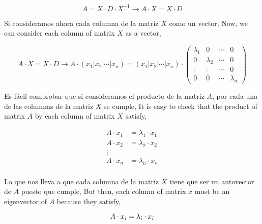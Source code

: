 \begin{equation*}
 A=X \cdot D \cdot X^{-1}\rightarrow A\cdot X= X\cdot D
\end{equation*}
\begin{paracol}{2}
Si consideramos ahora cada columna de la matriz $X$ como un vector,
\switchcolumn
Now, we can consider each column of matrix $X$ as a vector,
\end{paracol}
\begin{equation*}
A\cdot X= X\cdot D \rightarrow A\cdot \left( x_1 | x_2 | \cdots | x_n \right)= \left( x_1 | x_2 | \cdots | x_n \right) \cdot\begin{pmatrix}
\lambda_1& 0 & \cdots & 0\\
0& \lambda_2& \cdots & 0\\
\vdots & \vdots& \cdots & 0\\
0& 0& \cdots & \lambda_n
\end{pmatrix}
\end{equation*}
\begin{paracol}{2}
Es fácil comprobar que si consideramos el producto de la matriz $A$, por cada una de las columnas de la matriz $X$ se cumple,
\switchcolumn
It is easy to check that the product of matrix $A$ by each column of matrix $X$ satisfy, 
\end{paracol}
\begin{align*}
A\cdot x_1 &=\lambda_1 \cdot x_1 \\
A\cdot x_2 &=\lambda_2 \cdot x_2 \\
\vdots \\
A\cdot x_n &=\lambda_n \cdot x_n \\
\end{align*}
\begin{paracol}{2}
Lo que nos lleva a que cada columna de la matriz $X$ tiene que ser un autovector de $A$ puesto que cumple,
\switchcolumn
But then, each column of matrix $x$ must be an eigenvector of $A$ because they satisfy,
\end{paracol}
\begin{equation*}
A\cdot x_i =\lambda_i \cdot x_i \\
\end{equation*}
